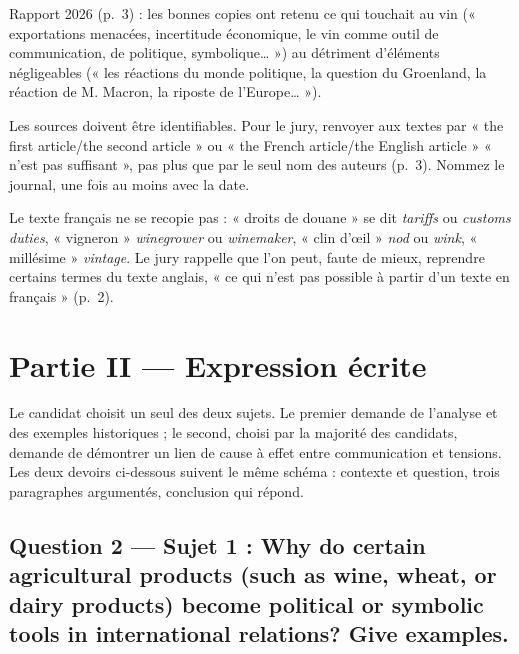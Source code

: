 \documentclass[11pt,a4paper]{article}
\begin{document}
\begin{jury}

Rapport 2026 (p.~3) : les bonnes copies ont retenu ce qui touchait au vin (« exportations menacées, incertitude économique, le vin comme outil de communication, de politique, symbolique\ldots{} ») au détriment d'éléments négligeables (« les réactions du monde politique, la question du Groenland, la réaction de M. Macron, la riposte de l'Europe\ldots{} »).

\end{jury}

\begin{piege}

Les sources doivent être identifiables. Pour le jury, renvoyer aux textes par « the first article/the second article » ou « the French article/the English article » « n'est pas suffisant », pas plus que par le seul nom des auteurs (p.~3). Nommez le journal, une fois au moins avec la date.

\end{piege}

\begin{piege}

Le texte français ne se recopie pas : « droits de douane » se dit \emph{tariffs} ou \emph{customs duties}, « vigneron » \emph{winegrower} ou \emph{winemaker}, « clin d'œil » \emph{nod} ou \emph{wink}, « millésime » \emph{vintage}. Le jury rappelle que l'on peut, faute de mieux, reprendre certains termes du texte anglais, « ce qui n'est pas possible à partir d'un texte en français » (p.~2).

\end{piege}

\hypertarget{partie-ii-expression-uxe9crite}{%
\section{Partie II --- Expression écrite}\label{partie-ii-expression-uxe9crite}}

Le candidat choisit un seul des deux sujets. Le premier demande de l'analyse et des exemples historiques ; le second, choisi par la majorité des candidats, demande de démontrer un lien de cause à effet entre communication et tensions. Les deux devoirs ci-dessous suivent le même schéma : contexte et question, trois paragraphes argumentés, conclusion qui répond.

\hypertarget{question-2-sujet-1-why-do-certain-agricultural-products-such-as-wine-wheat-or-dairy-products-become-political-or-symbolic-tools-in-international-relations-give-examples.}{%
\subsection{Question 2 --- Sujet 1 : Why do certain agricultural products (such as wine, wheat, or dairy products) become political or symbolic tools in international relations? Give examples.}\label{question-2-sujet-1-why-do-certain-agricultural-products-such-as-wine-wheat-or-dairy-products-become-political-or-symbolic-tools-in-international-relations-give-examples.}}
\end{document}
